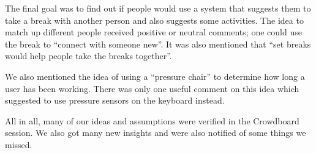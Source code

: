 The final goal was to find out if people would use a system that suggests them to take a break with another person and also suggests some activities. The idea to match up different people received positive or neutral comments; one could use the break to ``connect with someone new''. It was also mentioned that ``set breaks would help people take the breaks together''.


We also mentioned the idea of using a ``pressure chair'' to determine how long a user has been working. There was only one useful comment on this idea which suggested to use pressure sensors on the keyboard instead.

All in all, many of our ideas and assumptions were verified in the Crowdboard session. We also got many new insights and were also notified of some things we missed.


